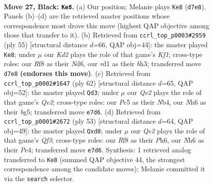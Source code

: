 \documentclass[11pt]{article}
\begin{document}
\clearpage

\begin{figure}[p]\centering
\begin{subfigure}{0.46\textwidth}\centering
\resizebox{\linewidth}{!}{%
\newchessgame
\chessboard[
  setfen={5r2/p1pkq1pp/1p2p2n/2p1Q3/5P2/2P3P1/1P5P/2KR4 b - - 2 27},
  showmover=false,
  pgfstyle=straightmove, color=movearrow, markmove={d7-e8}
]}
\caption{}
\end{subfigure}\hfill
\begin{subfigure}{0.46\textwidth}\centering
\resizebox{\linewidth}{!}{%
\newchessgame
\chessboard[
  setfen={5k2/1p2qpp1/pQpn3p/7P/8/4P1PB/PP3P2/6K1 b - - 0 28},
  showmover=false,
  pgfstyle=straightmove, color=movearrow, markmove={f8-e8}
]}
\caption{}
\end{subfigure}
\\[4pt]
\begin{subfigure}{0.46\textwidth}\centering
\resizebox{\linewidth}{!}{%
\newchessgame
\chessboard[
  setfen={5r1k/6p1/7p/3pp1b1/1N2q3/2P1P3/1P2Q1PP/R6K w - - 0 32},
  showmover=false,
  pgfstyle=straightmove, color=movearrow, markmove={e2-d3}
]}
\caption{}
\end{subfigure}\hfill
\begin{subfigure}{0.46\textwidth}\centering
\resizebox{\linewidth}{!}{%
\newchessgame
\chessboard[
  setfen={3R2k1/p4pp1/1p3q1p/8/4p3/1Q4P1/PP2PP1P/6K1 b - - 0 27},
  showmover=false,
  pgfstyle=straightmove, color=movearrow, markmove={f6-d8}
]}
\caption{}
\end{subfigure}
\caption{\textbf{Move 27, Black: \texttt{Ke8}.} (a) Our position; Melanie plays \texttt{Ke8} (\texttt{d7e8}). Panels (b)--(d) are the retrieved master positions whose correspondence most drove this move (highest QAP objective among those that transfer to it). (b) Retrieved from \texttt{ccrl\_top\_p0003\#2959} (ply 55) [structural distance $d$=66, QAP obj=44]: the master played \texttt{Ke8}; under $\mu$ our \emph{Kd2} plays the role of that game's \emph{Kf1}; cross-type roles: our \emph{R}f8 as their \emph{N}d6, our \emph{r}d1 as their \emph{b}h3; transferred move \texttt{d7e8} \textbf{(endorses this move)}. (c) Retrieved from \texttt{ccrl\_top\_p0002\#1647} (ply 62) [structural distance $d$=65, QAP obj=52]: the master played \texttt{Qd3}; under $\mu$ our \emph{Qe2} plays the role of that game's \emph{Qe2}; cross-type roles: our \emph{P}c5 as their \emph{N}b4, our \emph{N}h6 as their \emph{b}g5; transferred move \texttt{e7d6}. (d) Retrieved from \texttt{ccrl\_top\_p0001\#2672} (ply 53) [structural distance $d$=64, QAP obj=49]: the master played \texttt{Qxd8}; under $\mu$ our \emph{Qe2} plays the role of that game's \emph{Qf3}; cross-type roles: our \emph{R}f8 as their \emph{P}h6, our \emph{N}h6 as their \emph{P}e4; transferred move \texttt{e7d6}. Synthesis: 1 retrieved analog transferred to \texttt{Ke8} (summed QAP objective 44, the strongest correspondence among the candidate moves); Melanie committed it via the \texttt{search} selector.}
\label{fig:thought-m53}
\end{figure}
\end{document}
